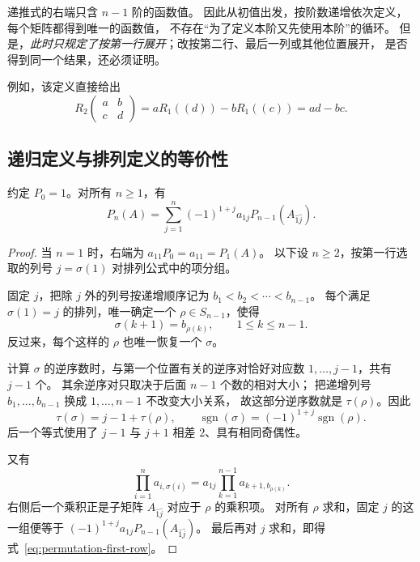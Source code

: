\documentclass[UTF8,12pt,a4paper,fontset=fandol]{ctexart}
\begin{document}
递推式的右端只含 $n-1$ 阶的函数值。
因此从初值出发，按阶数递增依次定义，每个矩阵都得到唯一的函数值，
不存在“为了定义本阶又先使用本阶”的循环。
但是，\emph{此时只规定了按第一行展开}；改按第二行、最后一列或其他位置展开，
是否得到同一个结果，还必须证明。

例如，该定义直接给出
\[
  R_2\!\begin{pmatrix}a&b\\c&d\end{pmatrix}
  =aR_1((d))-bR_1((c))=ad-bc.
\]

\subsection{递归定义与排列定义的等价性}

\begin{theorem}[排列公式满足第一行展开式]
\label{thm:first-row-expansion}
约定 $P_0=1$。对所有 $n\geq1$，有
\begin{equation}
  P_n(A)=\sum_{j=1}^{n}(-1)^{1+j}a_{1j}
  P_{n-1}(A_{\widehat1\widehat j}).
  \label{eq:permutation-first-row}
\end{equation}
\end{theorem}

\begin{proof}
当 $n=1$ 时，右端为 $a_{11}P_0=a_{11}=P_1(A)$。
以下设 $n\geq2$，按第一行选取的列号 $j=\sigma(1)$ 对排列公式中的项分组。

固定 $j$，把除 $j$ 外的列号按递增顺序记为
$b_1<b_2<\cdots<b_{n-1}$。
每个满足 $\sigma(1)=j$ 的排列，唯一确定一个 $\rho\in S_{n-1}$，使得
\[
  \sigma(k+1)=b_{\rho(k)},\qquad 1\leq k\leq n-1.
\]
反过来，每个这样的 $\rho$ 也唯一恢复一个 $\sigma$。

计算 $\sigma$ 的逆序数时，与第一个位置有关的逆序对恰好对应数
$1,\ldots,j-1$，共有 $j-1$ 个。
其余逆序对只取决于后面 $n-1$ 个数的相对大小；
把递增列号 $b_1,\ldots,b_{n-1}$ 换成 $1,\ldots,n-1$ 不改变大小关系，
故这部分逆序数就是 $\tau(\rho)$。因此
\[
  \tau(\sigma)=j-1+\tau(\rho),\qquad
  \operatorname{sgn}(\sigma)=(-1)^{1+j}\operatorname{sgn}(\rho).
\]
后一个等式使用了 $j-1$ 与 $j+1$ 相差 $2$、具有相同奇偶性。

又有
\[
  \prod_{i=1}^{n}a_{i,\sigma(i)}
  =a_{1j}\prod_{k=1}^{n-1}a_{k+1,b_{\rho(k)}}.
\]
右侧后一个乘积正是子矩阵 $A_{\widehat1\widehat j}$ 对应于 $\rho$ 的乘积项。
对所有 $\rho$ 求和，固定 $j$ 的这一组便等于
$(-1)^{1+j}a_{1j}P_{n-1}(A_{\widehat1\widehat j})$。
最后再对 $j$ 求和，即得式~\eqref{eq:permutation-first-row}。
\end{proof}
\end{document}
